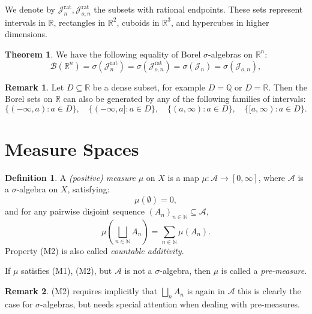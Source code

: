 \documentclass[12pt]{article}
\theoremstyle{definition}
\newtheorem{definition}{Definition}[section]
\newtheorem{theorem}{Theorem}[section]
\newtheorem{remark}{Remark}[section]
\begin{document}
We denote by $\mathcal{J}_n^{\mathrm{rat}}, \mathcal{J}_{o,n}^{\mathrm{rat}}$ the subsets with rational endpoints. These sets represent intervals in $\mathbb{R}$, rectangles in $\mathbb{R}^2$, cuboids in $\mathbb{R}^3$, and hypercubes in higher dimensions.

\begin{theorem}
We have the following equality of Borel $\sigma$-algebras on $\mathbb{R}^n$:
\[
\mathcal{B}(\mathbb{R}^n) = \sigma(\mathcal{J}_n^{\mathrm{rat}}) = \sigma(\mathcal{J}_{o,n}^{\mathrm{rat}}) = \sigma(\mathcal{J}_n) = \sigma(\mathcal{J}_{o,n}),
\]
\end{theorem}


\medskip
\begin{remark}
Let \(D \subseteq \mathbb{R}\) be a dense subset, for example \(D = \mathbb{Q}\) or \(D = \mathbb{R}\). 
Then the Borel sets on \(\mathbb{R}\) can also be generated by any of the following families of intervals:
\[
\{(-\infty, a) : a \in D\}, \quad \{(-\infty, a] : a \in D\}, \quad \{(a, \infty) : a \in D\}, \quad \{[a, \infty) : a \in D\}.
\]
\end{remark}



\vspace{3em}
\section{Measure Spaces}

\medskip
\begin{definition}
A \textit{(positive) measure} \(\mu\) on \(X\) is a map \(\mu : \mathcal{A} \to [0, \infty]\), where \(\mathcal{A}\) is a \(\sigma\)-algebra on \(X\), satisfying:
\[
\mu(\emptyset) = 0, \tag{M1}
\]
and for any pairwise disjoint sequence \((A_n)_{n \in \mathbb{N}} \subseteq \mathcal{A}\),
\[
\mu\left( \bigsqcup_{n \in \mathbb{N}} A_n \right) = \sum_{n \in \mathbb{N}} \mu(A_n). \tag{M2}
\]
Property (M2) is also called \emph{countable additivity}.

If \(\mu\) satisfies (M1), (M2), but \(\mathcal{A}\) is not a \(\sigma\)-algebra, then \(\mu\) is called a \textit{pre-measure}.
\end{definition}

\medskip
\begin{remark}
(M2) requires implicitly that \(\bigsqcup_{n} A_n\) is again in \(\mathcal{A}\) this is clearly the case for \(\sigma\)-algebras, but needs special attention when dealing with pre-measures.
\end{remark}
\end{document}
